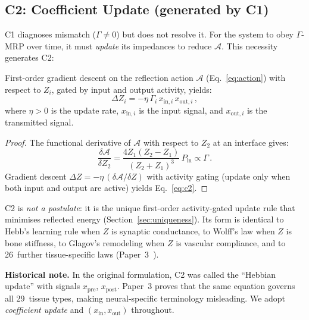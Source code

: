 \documentclass[aps,pre,twocolumn,superscriptaddress,floatfix]{revtex4-2}
\begin{document}
\subsection{C2: Coefficient Update (generated by C1)}
\label{sec:c2}

C1 diagnoses mismatch ($\Gamma \neq 0$) but does not
resolve it.
For the system to obey $\Gamma$-MRP over time,
it must \emph{update} its impedances to reduce
$\mathcal{A}$.
This necessity generates C2:

\begin{theorem}
\label{thm:c2}
First-order gradient descent on the reflection action
$\mathcal{A}$ (Eq.~\ref{eq:action}) with respect to $Z_i$,
gated by input and output activity, yields:
\begin{equation}
  \boxed{
  \Delta Z_i = -\eta\,\Gamma_i\,x_{\text{in},i}\,
  x_{\text{out},i}\,,
  }
  \label{eq:c2}
\end{equation}
where $\eta > 0$ is the update rate,
$x_{\text{in},i}$ is the input signal, and
$x_{\text{out},i}$ is the transmitted signal.
\end{theorem}

\begin{proof}
The functional derivative of $\mathcal{A}$ with respect
to $Z_2$ at an interface gives:
\begin{equation}
  \frac{\delta\mathcal{A}}{\delta Z_2}
  = \frac{4 Z_1(Z_2 - Z_1)}{(Z_2 + Z_1)^3}\,
  P_{\text{in}}
  \propto \Gamma\,.
  \label{eq:gradient}
\end{equation}
Gradient descent $\Delta Z = -\eta\,
(\delta\mathcal{A}/\delta Z)$ with activity gating
(update only when both input and output are active)
yields Eq.~\eqref{eq:c2}.
\end{proof}

\noindent
C2 is \emph{not a postulate}: it is the unique
first-order activity-gated update rule that minimises
reflected energy (Section~\ref{sec:uniqueness}).
Its form is identical to Hebb's learning rule when $Z$
is synaptic conductance, to Wolff's law when $Z$ is bone
stiffness, to Glagov's remodeling when $Z$ is vascular
compliance, and to 26~further tissue-specific laws
(Paper~3~\cite{Paper3}).

\medskip\noindent
\textbf{Historical note.}
In the original formulation, C2 was called the
``Hebbian update'' with signals $x_{\text{pre}}$,
$x_{\text{post}}$.
Paper~3 proves that the same equation governs all
29~tissue types, making neural-specific terminology
misleading.
We adopt \emph{coefficient update} and
$(x_{\text{in}}, x_{\text{out}})$ throughout.
\end{document}
